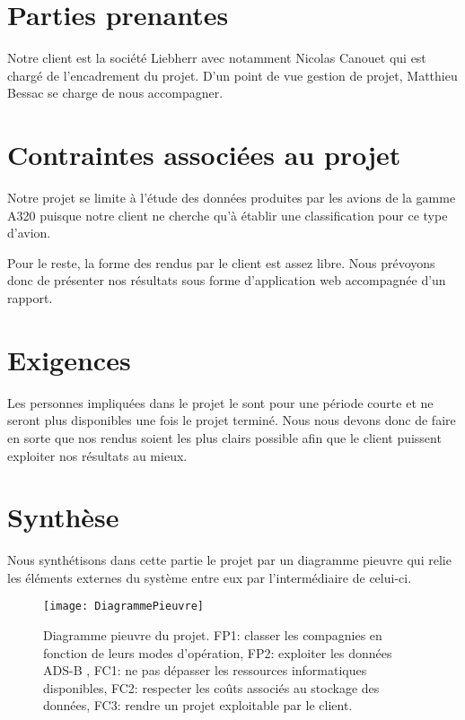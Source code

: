 \section*{Parties prenantes}
Notre client est la société Liebherr avec notamment Nicolas Canouet qui est chargé de l'encadrement du projet. D'un point de vue gestion de projet, Matthieu Bessac se charge de nous accompagner.

\section*{Contraintes associées au projet}
Notre projet se limite à l'étude des données produites par les avions de la gamme A320 puisque notre client ne cherche qu'à établir une classification pour ce type d'avion.

Pour le reste, la forme des rendus par le client est assez libre. Nous prévoyons donc de présenter nos résultats sous forme d'application web accompagnée d'un rapport.

\section*{Exigences}
Les personnes impliquées dans le projet le sont pour une période courte et ne seront plus disponibles une fois le projet terminé. Nous nous devons donc de faire en sorte que nos rendus soient les plus clairs possible afin que le client puissent exploiter nos résultats au mieux.

\section*{Synthèse}
Nous synthétisons dans cette partie le projet par un diagramme pieuvre qui relie les éléments externes du système entre eux par l'intermédiaire de celui-ci.

\begin{figure}[!ht]
	\centering
	\texttt{[image: DiagrammePieuvre]}
	\caption{
		Diagramme pieuvre du projet. FP1: classer les compagnies
		en fonction de leurs modes d'opération, FP2: exploiter les données ADS-B
		, FC1: ne pas dépasser les ressources informatiques disponibles,
		FC2: respecter les coûts associés au stockage des données,
		FC3: rendre un projet exploitable par le client.
	}
	\label{fig:pieuvre}
\end{figure}

